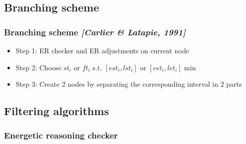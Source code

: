 \subsection{Branching scheme}

\begin{frame}
  \frametitle{Branching scheme {\small \it \color{gray!50!black!50} [Carlier \& Latapie, 1991]}}
  \begin{itemize}
    \vfill
  \item Step 1: ER checker and ER adjustments on current node 
    \vfill    
\pause
  \item Step 2: Choose $st_i$ or $ft_i$ s.t. $[est_i,lst_i]$ or
    $[eet_i,let_i]$ min
    \vfill
\pause
  \item Step 3: Create 2 nodes by separating the corresponding interval in 2 parts
  \end{itemize}
  \begin{overlayarea}{\textwidth}{4cm}
  \end{overlayarea}
  \vfill
\end{frame}

\subsection{Filtering algorithms}
\subsubsection{Energetic reasoning checker}



